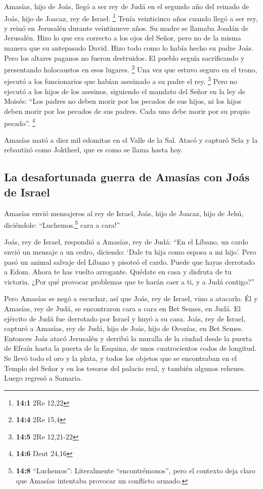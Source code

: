 Amasías, hijo de Joás, llegó a ser rey de Judá en el
segundo año del reinado de Joás, hijo de Joacaz, rey de Israel.
\footnote{\textbf{14:1} 2Re 12,22}  Tenía veinticinco años
cuando llegó a ser rey, y reinó en Jerusalén durante veintinueve años.
Su madre se llamaba Joadán de Jerusalén.  Hizo lo que era
correcto a los ojos del Señor, pero no de la misma manera que su
antepasado David. Hizo todo como lo había hecho su padre Joás.
 Pero los altares paganos no fueron destruidos. El pueblo
seguía sacrificando y presentando holocaustos en esos lugares.
\footnote{\textbf{14:4} 2Re 15,4}  Una vez que estuvo
seguro en el trono, ejecutó a los funcionarios que habían asesinado a su
padre el rey. \footnote{\textbf{14:5} 2Re 12,21-22}  Pero
no ejecutó a los hijos de los asesinos, siguiendo el mandato del Señor
en la ley de Moisés: ``Los padres no deben morir por los pecados de sus
hijos, ni los hijos deben morir por los pecados de sus padres. Cada uno
debe morir por su propio pecado''. \footnote{\textbf{14:6} Deut 24,16}

 Amasías mató a diez mil edomitas en el Valle de la Sal.
Atacó y capturó Sela y la rebautizó como Joktheel, que es como se llama
hasta hoy.

\hypertarget{la-desafortunada-guerra-de-amasuxedas-con-jouxe1s-de-israel}{%
\subsection{La desafortunada guerra de Amasías con Joás de
Israel}\label{la-desafortunada-guerra-de-amasuxedas-con-jouxe1s-de-israel}}

 Amasías envió mensajeros al rey de Israel, Joás, hijo de
Joacaz, hijo de Jehú, diciéndole: ``Luchemos,\footnote{\textbf{14:8}
  ``Luchemos'': Literalmente ``encontrémonos'', pero el contexto deja
  claro que Amasías intentaba provocar un conflicto armado.} cara a
cara!''

 Joás, rey de Israel, respondió a Amasías, rey de Judá:
``En el Líbano, un cardo envió un mensaje a un cedro, diciendo: `Dale tu
hija como esposa a mi hijo'. Pero pasó un animal salvaje del Líbano y
pisoteó el cardo.  Puede que hayas derrotado a Edom.
Ahora te has vuelto arrogante. Quédate en casa y disfruta de tu
victoria. ¿Por qué provocar problemas que te harán caer a ti, y a Judá
contigo?''

 Pero Amasías se negó a escuchar, así que Joás, rey de
Israel, vino a atacarlo. Él y Amasías, rey de Judá, se encontraron cara
a cara en Bet Semes, en Judá.  El ejército de Judá fue
derrotado por Israel y huyó a su casa.  Joás, rey de
Israel, capturó a Amasías, rey de Judá, hijo de Joás, hijo de Ocozías,
en Bet Semes. Entonces Joás atacó Jerusalén y derribó la muralla de la
ciudad desde la puerta de Efraín hasta la puerta de la Esquina, de unos
cuatrocientos codos de longitud.  Se llevó todo el oro y
la plata, y todos los objetos que se encontraban en el Templo del Señor
y en los tesoros del palacio real, y también algunos rehenes. Luego
regresó a Samaria.

